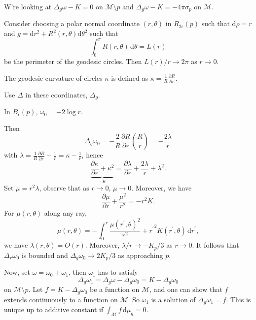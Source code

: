 \begin{prev}
	W're looking at \(\Delta _g \omega - K = 0\) on \(\mathcal{M} \setminus p\) and \(\Delta _g \omega - K = -4 \pi \sigma _p\) on \(\mathcal{M} \).
\end{prev}

Consider choosing a polar normal coordinate \((r, \theta )\) in \(R_{2 \epsilon }(p)\) such that \(\mathrm{d} \rho = r\) and \(g = \mathrm{d} r^2 + R^2(r, \theta )\mathrm{d} \theta ^2\) such that
\[
	\int_{0}^{\pi } R(r, \theta ) \,\mathrm{d}\theta = L(r)
\]
be the perimeter of the geodesic circles. Then \(L(r) / r \to 2\pi \) as \(r \to 0\).

\begin{notation}
	The geodesic curvature of circles \(\kappa \) is defined as \(\kappa = \frac{1}{R} \frac{\partial R}{\partial r} \).
\end{notation}

Use \(\Delta \) in these coordinates, \(\Delta _g\).

\begin{prev}
	In \(B_{\epsilon } (p)\), \(\omega _0=-2\log r\).
\end{prev}

Then
\[
	\Delta _g \omega _0 = - \frac{2}{R} \frac{\partial R}{\partial r} \left( \frac{R}{r} \right) = - \frac{2\lambda }{r}
\]
with \(\lambda = \frac{1}{R} \frac{\partial R}{\partial r} - \frac{1}{r} = \kappa - \frac{1}{r}\), hence
\[
	\underbrace{\frac{\partial \kappa }{\partial r} + \kappa ^2}_{-K } = \frac{\partial \lambda }{\partial r} + \frac{2\lambda }{r}+ \lambda ^2 .
\]
Set \(\mu = r^2 \lambda \), observe that as \(r \to 0\), \(\mu \to 0\). Moreover, we have
\[
	\frac{\partial \mu }{\partial r} + \frac{\mu ^2}{r^2} = -r^2 K.
\]
For \(\mu (r, \theta )\) along any ray,
\[
	\mu (r, \theta )
	= - \int_{0}^{r} \frac{\mu (r^{\prime} , \theta )^2}{r^2} + {r^{\prime} }^2 K (r^{\prime} , \theta )  \,\mathrm{d}r^{\prime},
\]
we have \(\lambda (r, \theta ) = O(r)\). Moreover, \(\lambda / r \to - K_p / 3\) as \(r \to 0\). It follows that \(\Delta _r \omega _0\) is bounded and \(\Delta _g \omega _0 \to 2K_p / 3\) as approaching \(p\).

Now, set \(\omega = \omega _0 + \omega _1\), then \(\omega _1\) has to satisfy
\[
	\Delta _g \omega _1
	= \Delta _g \omega - \Delta _g \omega _0
	= K - \Delta _g \omega _0
\]
on \(\mathcal{M} \setminus p\). Let \(f = K - \Delta _g \omega _0\) be a function on \(\mathcal{M} \), and one can show that \(f\) extends continuously to a function on \(\mathcal{M} \). So \(\omega _1\) is a solution of \(\Delta _g \omega _1 = f\). This is unique up to additive constant if \(\int _\mathcal{M} f \,\mathrm{d} \mu _g = 0\).

